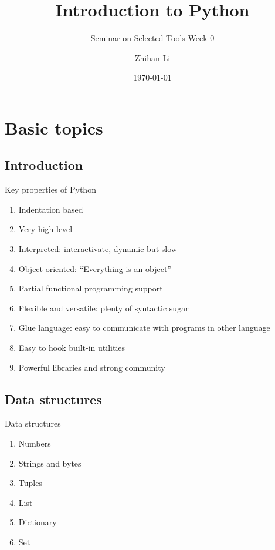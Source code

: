\documentclass[english, nochinese]{pkuslide}
\title{Introduction to Python}
\subtitle{Seminar on Selected Tools Week 0}
\author{Zhihan Li}
\date{\today}
\begin{document}
\begin{frame}
\titlepage
\end{frame}

\begin{frame}
\tableofcontents[subsectionstyle=show]
\end{frame}

\section{Basic topics}

\begin{frame}
\sectionpage
\end{frame}

\subsection{Introduction}

\begin{frame}{Key properties of Python}
\begin{enumerate}
\item Indentation based
\item Very-high-level
\item Interpreted: interactivate, dynamic but slow
\item Object-oriented: ``Everything is an object''
\item Partial functional programming support
\item Flexible and versatile: plenty of syntactic sugar
\item Glue language: easy to communicate with programs in other language
\item Easy to hook built-in utilities
\item Powerful libraries and strong community
\end{enumerate}
\end{frame}

\subsection{Data structures}

\begin{frame}{Data structures}
\begin{enumerate}
\item Numbers
\item Strings and bytes
\item Tuples
\item List
\item Dictionary
\item Set
\end{enumerate}
\end{frame}
\end{document}
